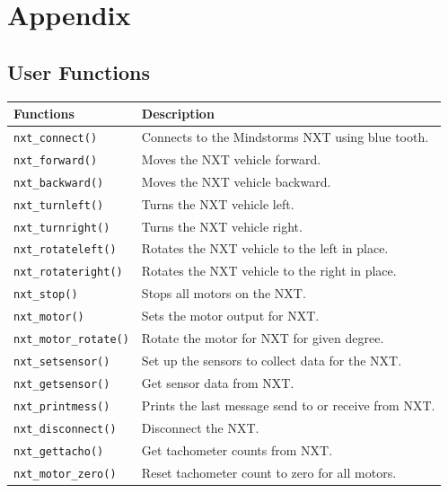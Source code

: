 \documentclass[12pt]{article}
\begin{document}
\section{Appendix}

\subsection{User Functions}
\begin{tabular}{ | l | p{11cm} |}\hline
Functions & Description\\
\hline
\verb+nxt_connect()+ 		& Connects to the Mindstorms NXT using blue tooth.\\
\verb+nxt_forward()+		& Moves the NXT vehicle forward.\\
\verb+nxt_backward()+		& Moves the NXT vehicle backward.\\
\verb+nxt_turnleft()+		& Turns the NXT vehicle left.\\
\verb+nxt_turnright()+		& Turns the NXT vehicle right.\\
\verb+nxt_rotateleft()+		& Rotates the NXT vehicle to the left in place.\\
\verb+nxt_rotateright()+	& Rotates the NXT vehicle to the right in place.\\
\verb+nxt_stop()+	        & Stops all motors on the NXT.\\
\verb+nxt_motor()+			& Sets the motor output for NXT.\\
\verb+nxt_motor_rotate()+ 	& Rotate the motor for NXT for given degree.\\
\verb+nxt_setsensor()+		& Set up the sensors to collect data for the NXT.\\
\verb+nxt_getsensor()+		& Get sensor data from NXT.\\
\verb+nxt_printmess()+ 		& Prints the last message send to or receive from NXT.\\
\verb+nxt_disconnect()+ 	& Disconnect the NXT.\\
\verb+nxt_gettacho()+		& Get tachometer counts from NXT.\\
\verb+nxt_motor_zero()+		& Reset tachometer count to zero for all motors.\\
\hline
\end{tabular}

\end{document}

